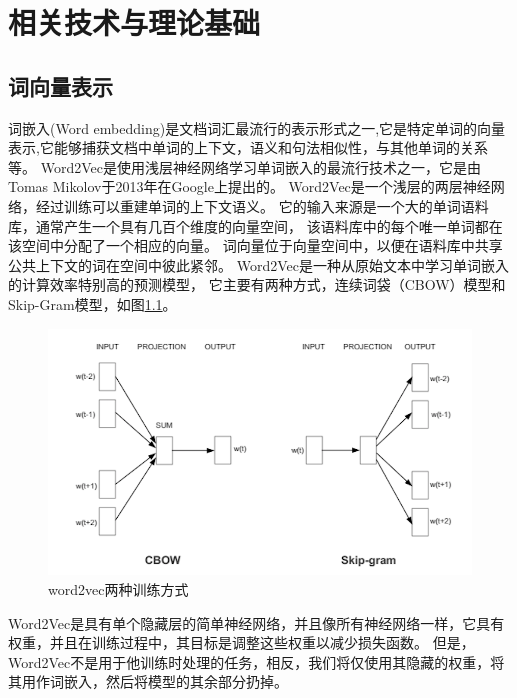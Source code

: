 \chapter{相关技术与理论基础}

\section{词向量表示}

词嵌入(Word embedding)是文档词汇最流行的表示形式之一,它是特定单词的向量表示,它能够捕获文档中单词的上下文，语义和句法相似性，与其他单词的关系等。
Word2Vec是使用浅层神经网络学习单词嵌入的最流行技术之一，它是由Tomas Mikolov于2013年在Google上提出的。
Word2Vec是一个浅层的两层神经网络，经过训练可以重建单词的上下文语义。 它的输入来源是一个大的单词语料库，通常产生一个具有几百个维度的向量空间，
该语料库中的每个唯一单词都在该空间中分配了一个相应的向量。 词向量位于向量空间中，以便在语料库中共享公共上下文的词在空间中彼此紧邻。 
Word2Vec是一种从原始文本中学习单词嵌入的计算效率特别高的预测模型，
它主要有两种方式，连续词袋（CBOW）模型和Skip-Gram模型，如图\ref{fig:word2vec_diagrams}。

\begin{figure}[htbp]
    \centering
    \includegraphics[scale=0.5]{./images/word2vec_diagrams.png}
    \caption{word2vec两种训练方式}
    \label{fig:word2vec_diagrams}
  \end{figure}

  Word2Vec是具有单个隐藏层的简单神经网络，并且像所有神经网络一样，它具有权重，并且在训练过程中，其目标是调整这些权重以减少损失函数。 
  但是，Word2Vec不是用于他训练时处理的任务，相反，我们将仅使用其隐藏的权重，将其用作词嵌入，然后将模型的其余部分扔掉。